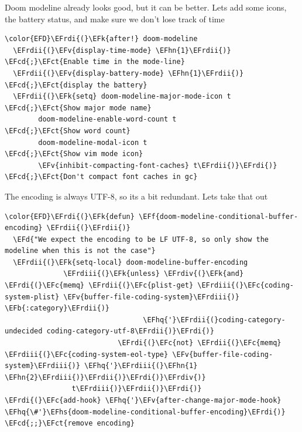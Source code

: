 \documentclass{scrartcl}
\newcommand{\EFk}[1]{\textcolor{EFk}{#1}} %
\newcommand{\EFd}[1]{\textcolor{EFd}{#1}} %
\newcommand{\EFb}[1]{\textcolor{EFb}{#1}} %
\newcommand{\EFct}[1]{\textcolor{EFct}{#1}} %
\newcommand{\EFc}[1]{\textcolor{EFc}{#1}} %
\newcommand{\EFv}[1]{\textcolor{EFv}{#1}} %
\newcommand{\EFf}[1]{\textcolor{EFf}{#1}} %
\newcommand{\EFcd}[1]{\textcolor{EFcd}{#1}} %
\newcommand{\EFhn}[1]{#1} %
\newcommand{\EFhq}[1]{#1} %
\newcommand{\EFhs}[1]{#1} %
\newcommand{\EFrdi}[1]{#1} %
\newcommand{\EFrdii}[1]{#1} %
\newcommand{\EFrdiii}[1]{#1} %
\newcommand{\EFrdiv}[1]{#1} %
\begin{document}
Doom modeline already looks good, but it can be better. Lets add some icons, the battery status, and make sure we don't lose track of time
\begin{Code}
\begin{Verbatim}[]
\color{EFD}\EFrdi{(}\EFk{after!} doom-modeline
  \EFrdii{(}\EFv{display-time-mode} \EFhn{1}\EFrdii{)}                              \EFcd{;}\EFct{Enable time in the mode-line}
  \EFrdii{(}\EFv{display-battery-mode} \EFhn{1}\EFrdii{)}                           \EFcd{;}\EFct{display the battery}
  \EFrdii{(}\EFk{setq} doom-modeline-major-mode-icon t              \EFcd{;}\EFct{Show major mode name}
        doom-modeline-enable-word-count t            \EFcd{;}\EFct{Show word count}
        doom-modeline-modal-icon t                   \EFcd{;}\EFct{Show vim mode icon}
        \EFv{inhibit-compacting-font-caches} t\EFrdii{)}\EFrdi{)}           \EFcd{;}\EFct{Don't compact font caches in gc}
\end{Verbatim}
\end{Code}

The encoding is always UTF-8, so its a bit redundant. Lets take that out
\begin{Code}
\begin{Verbatim}[]
\color{EFD}\EFrdi{(}\EFk{defun} \EFf{doom-modeline-conditional-buffer-encoding} \EFrdii{(}\EFrdii{)}
  \EFd{"We expect the encoding to be LF UTF-8, so only show the modeline when this is not the case"}
  \EFrdii{(}\EFk{setq-local} doom-modeline-buffer-encoding
              \EFrdiii{(}\EFk{unless} \EFrdiv{(}\EFk{and} \EFrdi{(}\EFc{memq} \EFrdii{(}\EFc{plist-get} \EFrdiii{(}\EFc{coding-system-plist} \EFv{buffer-file-coding-system}\EFrdiii{)} \EFb{:category}\EFrdii{)}
                                 \EFhq{'}\EFrdii{(}coding-category-undecided coding-category-utf-8\EFrdii{)}\EFrdi{)}
                           \EFrdi{(}\EFc{not} \EFrdii{(}\EFc{memq} \EFrdiii{(}\EFc{coding-system-eol-type} \EFv{buffer-file-coding-system}\EFrdiii{)} \EFhq{'}\EFrdiii{(}\EFhn{1} \EFhn{2}\EFrdiii{)}\EFrdii{)}\EFrdi{)}\EFrdiv{)}
                t\EFrdiii{)}\EFrdii{)}\EFrdi{)}
\EFrdi{(}\EFc{add-hook} \EFhq{'}\EFv{after-change-major-mode-hook} \EFhq{\#'}\EFhs{doom-modeline-conditional-buffer-encoding}\EFrdi{)} \EFcd{;;}\EFct{remove encoding}
\end{Verbatim}
\end{Code}
\end{document}

